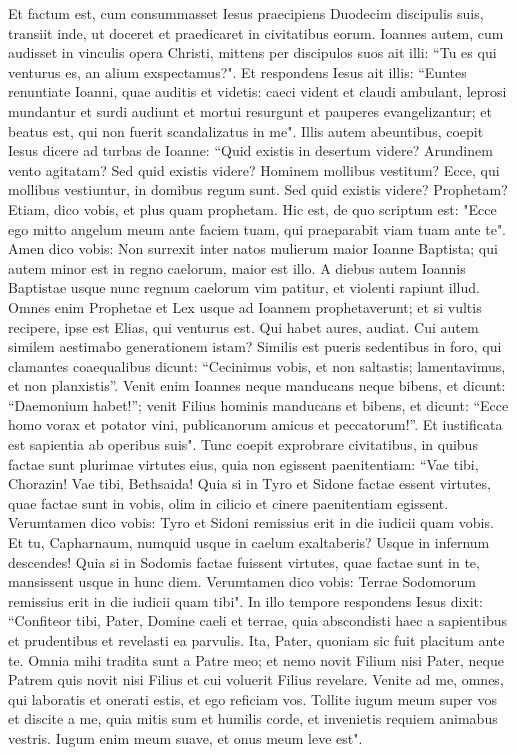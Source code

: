 \begin{biblechapter}  
\verse Et factum est, cum consummasset Iesus praecipiens Duodecim discipulis suis, transiit inde, ut doceret et praedicaret in civitatibus eorum. 
\verse Ioannes autem, cum audisset in vinculis opera Christi, mittens per discipulos suos 
\verse ait illi: “Tu es qui venturus es, an alium exspectamus?". 
\verse Et respondens Iesus ait illis: “Euntes renuntiate Ioanni, quae auditis et videtis:  
\verse caeci vident et claudi ambulant, leprosi mundantur et surdi audiunt et mortui resurgunt et pauperes evangelizantur; 
\verse et beatus est, qui non fuerit scandalizatus in me". 
\verse Illis autem abeuntibus, coepit Iesus dicere ad turbas de Ioanne: “Quid existis in desertum videre? Arundinem vento agitatam?  
\verse Sed quid existis videre? Hominem mollibus vestitum? Ecce, qui mollibus vestiuntur, in domibus regum sunt. 
\verse Sed quid existis videre? Prophetam? Etiam, dico vobis, et plus quam prophetam. 
\verse Hic est, de quo scriptum est: "Ecce ego mitto angelum meum ante faciem tuam, qui praeparabit viam tuam ante te". 
\verse Amen dico vobis: Non surrexit inter natos mulierum maior Ioanne Baptista; qui autem minor est in regno caelorum, maior est illo. 
\verse A diebus autem Ioannis Baptistae usque nunc regnum caelorum vim patitur, et violenti rapiunt illud.  
\verse Omnes enim Prophetae et Lex usque ad Ioannem prophetaverunt; 
\verse et si vultis recipere, ipse est Elias, qui venturus est. 
\verse Qui habet aures, audiat. 
\verse Cui autem similem aestimabo generationem istam? Similis est pueris sedentibus in foro, qui clamantes coaequalibus 
\verse dicunt: “Cecinimus vobis, et non saltastis; lamentavimus, et non planxistis”. 
\verse Venit enim Ioannes neque manducans neque bibens, et dicunt: “Daemonium habet!”; 
\verse venit Filius hominis manducans et bibens, et dicunt: “Ecce homo vorax et potator vini, publicanorum amicus et peccatorum!”. Et iustificata est sapientia ab operibus suis". 
\verse Tunc coepit exprobrare civitatibus, in quibus factae sunt plurimae virtutes eius, quia non egissent paenitentiam: 
\verse “Vae tibi, Chorazin! Vae tibi, Bethsaida! Quia si in Tyro et Sidone factae essent virtutes, quae factae sunt in vobis, olim in cilicio et cinere paenitentiam egissent. 
\verse Verumtamen dico vobis: Tyro et Sidoni remissius erit in die iudicii quam vobis. 
\verse Et tu, Capharnaum, numquid usque in caelum exaltaberis? Usque in infernum descendes! Quia si in Sodomis factae fuissent virtutes, quae factae sunt in te, mansissent usque in hunc diem. 
\verse Verumtamen dico vobis: Terrae Sodomorum remissius erit in die iudicii quam tibi". 
\verse In illo tempore respondens Iesus dixit: “Confiteor tibi, Pater, Domine caeli et terrae, quia abscondisti haec a sapientibus et prudentibus et revelasti ea parvulis. 
\verse Ita, Pater, quoniam sic fuit placitum ante te. 
\verse Omnia mihi tradita sunt a Patre meo; et nemo novit Filium nisi Pater, neque Patrem quis novit nisi Filius et cui voluerit Filius revelare. 
\verse Venite ad me, omnes, qui laboratis et onerati estis, et ego reficiam vos.  
\verse Tollite iugum meum super vos et discite a me, quia mitis sum et humilis corde, et invenietis requiem animabus vestris. 
\verse Iugum enim meum suave, et onus meum leve est". 
\end{biblechapter}

